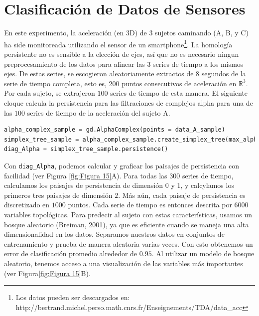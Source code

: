 \section{Clasificaci\'on de Datos de Sensores}
En este experimento, la aceleraci\'on (en $3$D) de $3$ sujetos caminando
(A, B, y C) ha side monitoreada utilizando el sensor de un
smartphone\footnote{Los datos pueden ser descargados en:
http://bertrand.michel.perso.math.cnrs.fr/Enseignements/TDA/data\_acc}.
La homolog\'ia persistente no es sensible a la elecci\'on de ejes,
así que no es necesario ningun preprocesamiento de los datos para alinear
las $3$ series de tiempo a los mismos ejes.
De estas series, se escogieron aleatoriamente extractos de
$8$ segundos de la serie de tiempo completa, esto es,
$200$ puntos consecutivos de aceleraci\'on en $\mathbb{R}^{3}$.
Por cada sujeto, se extrajeron $100$ series de tiempo de esta manera.
El siguiente cloque calcula la persistencia para las filtraciones de complejos alpha para
una de las $100$ series de tiempo de la aceleraci\'on del sujeto A.

\begin{lstlisting}[language=Python]
alpha_complex_sample = gd.AlphaComplex(points = data_A_sample)
simplex_tree_sample = alpha_complex_sample.create_simplex_tree(max_alpha_square = 0.3)
diag_Alpha = simplex_tree_sample.persistence()
\end{lstlisting}

Con \verb|diag_Alpha|, podemos calcular y graficar
los paisajes de persistencia con facilidad (ver Figura \ref{fig:Figura 15}A).
Para todas las $300$ series de tiempo, calculamos los paisajes de persistencia de
dimensi\'on $0$ y $1$, y calcylamos los primeros tres paisajes de dimensi\'on $2$.
M\'as a\'un, cada paisaje de persistencia es discretizado en $1000$ puntos.
Cada serie de tiempo es entonces descrita por $6000$ variables topol\'ogicas.
Para predecir al sujeto con estas caracter\'isticas, usamos un bosque aleatorio
(Breiman, 2001\cite{Breiman2001}), ya que es eficiente cuando se maneja una
alta dimensionalidad en los datos.
Separamos nuestros datos en conjuntos de entrenamiento y prueba de manera
aleatoria varias veces.
Con esto obtenemos un error de clasificaci\'on promedio alrededor de $0.95$.
Al utilizar un modelo de bosque aleatorio, tenemos acceso a una visualizaci\'on
de las variables m\'as importantes (ver Figura\ref{fig:Figura 15}B).

